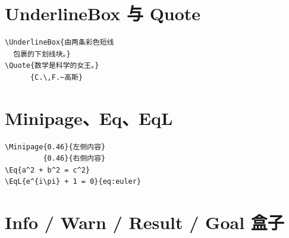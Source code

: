 \section{UnderlineBox 与 Quote}

\begin{fullwidth}
\begin{minipage}[t]{0.48\linewidth}
\end{minipage}\hfill
\begin{minipage}[t]{0.48\linewidth}
\begin{lstlisting}[language={[LaTeX]TeX}]
\UnderlineBox{由两条彩色短线
  包裹的下划线块。}
\Quote{数学是科学的女王。}
      {C.\,F.~高斯}
\end{lstlisting}
\end{minipage}
\end{fullwidth}

\section{Minipage、Eq、EqL}

\begin{fullwidth}
\begin{minipage}[t]{0.48\linewidth}
\end{minipage}\hfill
\begin{minipage}[t]{0.48\linewidth}
\begin{lstlisting}[language={[LaTeX]TeX}]
\Minipage{0.46}{左侧内容}
         {0.46}{右侧内容}
\Eq{a^2 + b^2 = c^2}
\EqL{e^{i\pi} + 1 = 0}{eq:euler}
\end{lstlisting}
\end{minipage}
\end{fullwidth}

\section{Info / Warn / Result / Goal 盒子}

